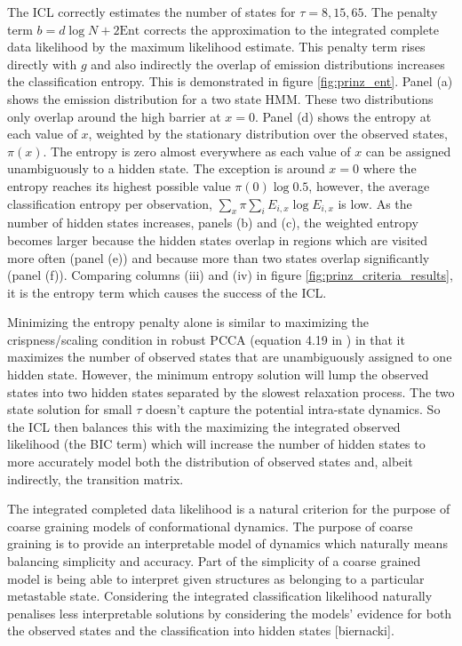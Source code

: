 The ICL correctly estimates the number of states for $\tau = 8, 15,  65$. The penalty term $b=d\log{N}+2\mathrm{Ent}$ corrects the approximation to the integrated complete data likelihood by the maximum likelihood estimate. This penalty term rises directly with $g$ and also indirectly the overlap of emission distributions increases the classification entropy. This is demonstrated in figure \ref{fig:prinz_ent}. Panel (a) shows the emission distribution for a two state HMM. These two distributions only overlap around the high barrier at $x=0$. Panel (d) shows the entropy at each value of $x$, weighted by the stationary distribution over the observed states, $\pi(x)$. The entropy is zero almost everywhere as each value of $x$ can be assigned unambiguously to a hidden state. The exception is around $x=0$ where the entropy reaches its highest possible value $\pi(0)\log{0.5}$, however, the average classification entropy per observation, $\sum_{x}\pi\sum_{i}E_{i, x}\log{E_{i, x}}$ is low. As the number of hidden states increases, panels (b) and (c), the weighted entropy becomes larger because the hidden states overlap in regions which are visited more often (panel (e)) and because more than two states overlap significantly (panel (f)). Comparing columns (iii) and (iv) in figure \ref{fig:prinz_criteria_results}, it is the entropy term which causes the success of the ICL. 

Minimizing the entropy penalty alone is similar to maximizing the crispness/scaling condition  in robust PCCA (equation 4.19 in \cite{deuflhardRobustPerronCluster2005b}) in that it maximizes the number of  observed states that are unambiguously assigned to one hidden state.  However, the minimum entropy solution will lump the observed states into two hidden states separated by the slowest relaxation process. The two state solution for small $\tau$ doesn't capture the potential intra-state dynamics. So the ICL then balances this with the maximizing the integrated observed likelihood (the BIC term) which will increase the number of hidden states to more accurately model both the distribution of observed states and, albeit indirectly, the transition matrix. 

The integrated completed data likelihood is a natural criterion for the purpose of coarse graining  models of conformational dynamics. The purpose of coarse graining is to provide an interpretable model of dynamics which naturally means balancing simplicity and accuracy. Part of the simplicity of a coarse grained model is being able to interpret given structures as belonging to a particular metastable state. Considering the integrated classification likelihood naturally penalises less interpretable solutions by considering the models' evidence for both the observed states and the classification into hidden states [biernacki]. 

